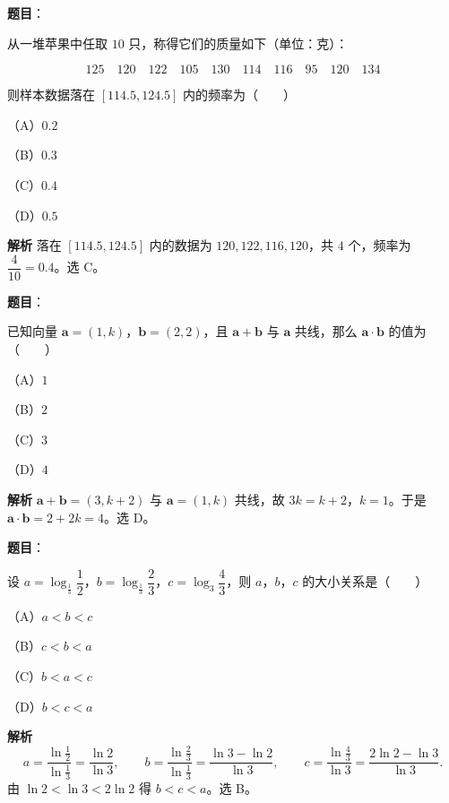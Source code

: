 \begin{answer}

\textbf{题目}：

从一堆苹果中任取 $10$ 只，称得它们的质量如下（单位：克）：

\nopagebreak[4]
\[125\quad120\quad122\quad105\quad130\quad114\quad116\quad95\quad120\quad134\]

则样本数据落在 $[114.5,124.5]$ 内的频率为\mbox{（　　）}

（A）$0.2$

（B）$0.3$

（C）$0.4$

（D）$0.5$

\textbf{解析}
落在 $[114.5,124.5]$ 内的数据为 $120,122,116,120$，共 $4$ 个，频率为 $\dfrac4{10}=0.4$。选 C。


\end{answer}
\begin{answer}

\textbf{题目}：

已知向量 $\boldsymbol a=(1,k)$，$\boldsymbol b=(2,2)$，且 $\boldsymbol a+\boldsymbol b$ 与 $\boldsymbol a$ 共线，那么 $\boldsymbol a\cdot\boldsymbol b$ 的值为\mbox{（　　）}

（A）$1$

（B）$2$

（C）$3$

（D）$4$

\textbf{解析}
$\boldsymbol a+\boldsymbol b=(3,k+2)$ 与 $\boldsymbol a=(1,k)$ 共线，故 $3k=k+2$，$k=1$。于是 $\boldsymbol a\cdot\boldsymbol b=2+2k=4$。选 D。


\end{answer}
\begin{answer}

\textbf{题目}：

设 $a=\log_{\frac13}\dfrac12$，$b=\log_{\frac13}\dfrac23$，$c=\log_3\dfrac43$，则 $a$，$b$，$c$ 的大小关系是\mbox{（　　）}

（A）$a<b<c$

（B）$c<b<a$

（C）$b<a<c$

（D）$b<c<a$

\textbf{解析}
\nopagebreak[4]
\[a=\frac{\ln\frac12}{\ln\frac13}=\frac{\ln2}{\ln3},\qquad b=\frac{\ln\frac23}{\ln\frac13}=\frac{\ln3-\ln2}{\ln3},\qquad c=\frac{\ln\frac43}{\ln3}=\frac{2\ln2-\ln3}{\ln3}.\]
由 $\ln2<\ln3<2\ln2$ 得 $b<c<a$。选 B。


\end{answer}
